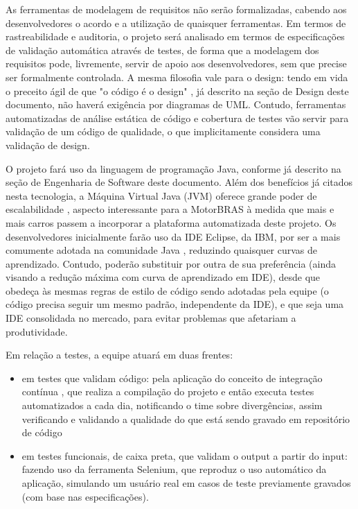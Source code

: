 \documentclass[12pt,journal,compsoc]{IEEEtran}
\begin{document}
As ferramentas de modelagem de requisitos não serão formalizadas, cabendo aos desenvolvedores o acordo e a utilização de quaisquer ferramentas. Em termos de rastreabilidade e auditoria, o projeto será analisado em termos de especificações de validação automática através de testes, de forma que a modelagem dos requisitos pode, livremente, servir de apoio aos desenvolvedores, sem que precise ser formalmente controlada. A mesma filosofia vale para o design: tendo em vida o preceito ágil de que "o código é o design" \cite{fowler_design_dead}, já descrito na seção de Design deste documento, não haverá exigência por diagramas de UML. Contudo, ferramentas automatizadas de análise estática de código e cobertura de testes vão servir para validação de um código de qualidade, o que implicitamente considera uma validação de design.

O projeto fará uso da linguagem de programação Java, conforme já descrito na seção de Engenharia de Software deste documento. Além dos benefícios já citados nesta tecnologia, a Máquina Virtual Java (JVM) oferece grande poder de escalabilidade \cite{10.1109/IISWC.2005.1526008}, aspecto interessante para a MotorBRAS à medida que mais e mais carros passem a incorporar a plataforma automatizada deste projeto. Os desenvolvedores inicialmente farão uso da IDE Eclipse, da IBM, por ser a mais comumente adotada na comunidade Java \cite{java_report_2012}, reduzindo quaisquer curvas de aprendizado. Contudo, poderão substituir por outra de sua preferência (ainda visando a redução máxima com curva de aprendizado em IDE), desde que obedeça às mesmas regras de estilo de código sendo adotadas pela equipe (o código precisa seguir um mesmo padrão, independente da IDE), e que seja uma IDE consolidada no mercado, para evitar problemas que afetariam a produtividade.   

Em relação a testes, a equipe atuará em duas frentes: 
\begin{itemize}
\item em testes que validam código: pela aplicação do conceito de integração contínua \cite{fowler_continuous_integration}, que realiza a compilação do projeto e então executa testes automatizados a cada dia, notificando o time sobre divergências, assim verificando e validando a qualidade do que está sendo gravado em repositório de código
\item em testes funcionais, de caixa preta, que validam o output a partir do input: fazendo uso da ferramenta Selenium, que reproduz o uso automático da aplicação, simulando um usuário real em casos de teste previamente gravados (com base nas especificações). 
\end{itemize}
\end{document}
